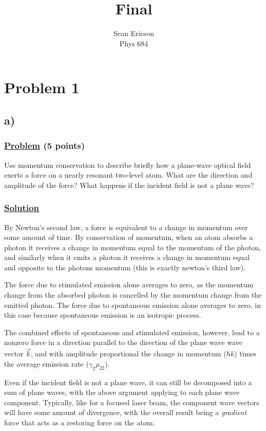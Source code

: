 \documentclass[12pt]{article}
\begin{document}
	
\title{Final}
\author{Sean Ericson \\ Phys 684}
\maketitle

\section*{Problem 1}
\subsection*{a)}
\subsubsection*{\underline{Problem} (5 points)}
Use momentum conservation to describe briefly how a plane-wave optical field exerts a force on a nearly resonant two-level atom.
What are the direction and amplitude of the force?
What happens if the incident field is not a plane wave?

\subsubsection*{\underline{Solution}}
By Newton's second law, a force is equivalent to a change in momentum over some amount of time. 
By conservation of momentum, when an atom absorbs a photon it receives a change in momentum equal to the momentum of the photon, and similarly when it emits a photon it receives a change in momentum equal and opposite to the photons momentum (this is exactly newton's third law).

The force due to stimulated emission alone averages to zero, as the momentum change from the absorbed photon is cancelled by the momentum change from the emitted photon.
The force due to spontaneous emission alone averages to zero, in this case because spontaneous emission is an isotropic process.

The combined effects of spontaneous and stimulated emission, however, lead to a nonzero force in a direction parallel to the direction of the plane wave wave vector $\vec{k}$, and with amplitude proportional the change in momentum ($\hbar k$) times the average emission rate ($\gamma_2\rho_{22}$).

Even if the incident field is not a plane wave, it can still be decomposed into a sum of plane waves, with the above argument applying to each plane wave component.
Typically, like for a focused laser beam, the component wave vectors will have some amount of divergence, with the overall result being a \textit{gradient} force that acts as a restoring force on the atom.
\end{document}
